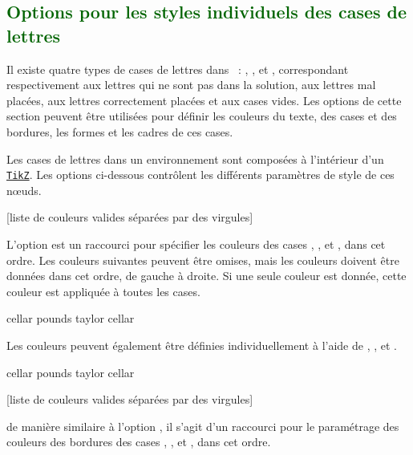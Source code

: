 \documentclass[svgnames]{report}
\newcommand\ctan[1]{\href{https://www.ctan.org/pkg/#1}{\texttt{#1}}}
\newcommand\Section[1]{\subsection{\textcolor{DarkGreen}{#1}}}
\begin{document}
  \Section{Options pour les styles individuels des cases de lettres}

  Il existe quatre types de cases de lettres dans  :
  , ,  et
  , correspondant respectivement aux lettres qui ne sont pas dans la solution,
  aux lettres mal placées, aux lettres correctement placées et aux cases vides. Les options de cette section peuvent être utilisées pour
  définir les couleurs du texte, des cases et des bordures, les formes et les cadres de ces cases.

  Les cases de lettres dans un environnement  sont composées à l'intérieur
  d'un \keyword{\node} \ctan{TikZ}. Les options ci-dessous contrôlent les
  différents paramètres de style de ces nœuds.

  [liste de couleurs valides séparées par des virgules]

  L'option  est un raccourci pour spécifier les
  couleurs des cases , ,  et
  , dans cet ordre. Les couleurs suivantes peuvent être omises, mais
  les couleurs doivent être données dans cet ordre, de gauche à droite.
  Si une seule couleur est donnée, cette couleur est appliquée à toutes les cases.

  \begin{example}
  \begin{GrilleSutom}[Couleurs={LightGray,Orange,Teal}]{cellar}
    pounds
    taylor
    cellar
  \end{GrilleSutom}
  \end{example}

  Les couleurs peuvent également être définies individuellement à l'aide de , ,  et .

  \begin{example}
  \begin{GrilleSutom}[couleur absent=DarkGray,couleur present=Salmon,
                 couleur correct=SeaGreen]{cellar}
    pounds
    taylor
    cellar
  \end{GrilleSutom}
  \end{example}

  [liste de couleurs valides séparées par des virgules]

  de manière similaire à l'option  , il s'agit d'un raccourci pour le paramétrage des couleurs des bordures des cases , ,
   et , dans cet ordre.
\end{document}
